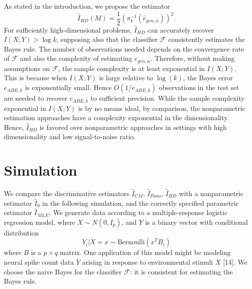 \documentclass{article}
\begin{document}
As stated in the introduction, we propose the estimator
\[
\hat{I}_{HD}(M) = \frac{1}{2}(\pi_{k}^{-1}(\hat{e}_{gen, \alpha}))^2.
\]
For sufficiently high-dimensional problems, $\hat{I}_{HD}$ can
accurately recover $I(X; Y) > \log k$, supposing also that the
classifier $\mathcal{F}$ consistently estimates the Bayes rule.  The
number of observations needed depends on the convergence rate of
$\mathcal{F}$ and also the complexity of estimating $e_{gen, \alpha}$.
Therefore, without making assumptions on $\mathcal{F}$, the sample
complexity is at least exponential in $I(X; Y)$.  This is because when
$I(X; Y)$ is large relative to $\log(k)$, the Bayes error $e_{ABE, k}$
is exponentially small.  Hence $O(1/e_{ABE, k})$ observations in the
test set are needed to recover $e_{ABE, k}$ to sufficient precision.
While the sample complexity exponential in $I(X; Y)$ is by no means
ideal, by comparison, the nonparametric estimation approaches have a
complexity exponential in the dimensionality.  Hence, $\hat{I}_{HD}$
is favored over nonparametric approaches in settings with high
dimensionality and low signal-to-noise ratio.


\section{Simulation}

We compare the discriminative estimators $\hat{I}_{CM}$,
$\hat{I}_{Fano}$, $\hat{I}_{HD}$ with a nonparametric estimator
$\hat{I}_0$ in the following simulation, and the correctly specified parametric estimator $\hat{I}_{MLE}$.  We generate data according
to a multiple-response logistic regression model, where $ X \sim N(0,
I_p) $, and $Y$ is a binary vector with conditional distribution
\[
Y_i|X = x \sim \text{Bernoulli}(x^T B_i)
\]
where $B$ is a $p \times q$ matrix.  One application of this model
might be modeling neural spike count data $Y$ arising in response to
environmental stimuli $X$ [14].  We choose the naive Bayes for the
classifier $\mathcal{F}$: it is consistent for estimating the Bayes
rule. 
\end{document}
